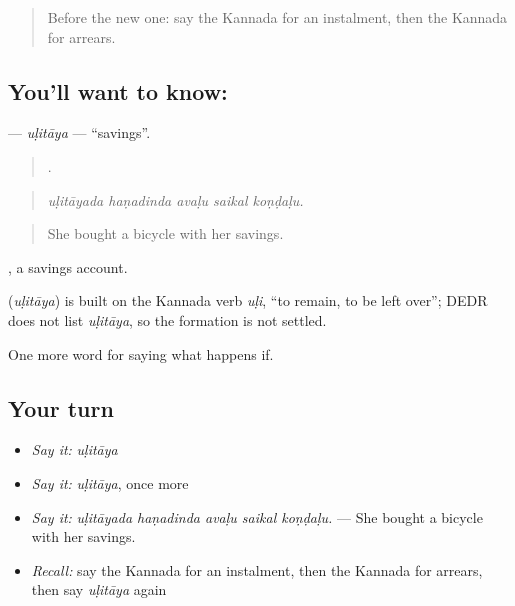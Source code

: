 \label{lesson:KA-C417-ulitaya}



\begin{quote}
Before the new one: say the Kannada for an instalment, then the Kannada for arrears.
\end{quote}

\subsection*{You'll want to know: }
\textbf{} — \emph{uḷitāya} — \textquotedblleft{}savings\textquotedblright{}.

\begin{quote}
    .
\end{quote}

\begin{quote}
\emph{uḷitāyada haṇadinda avaḷu saikal koṇḍaḷu.}
\end{quote}

\begin{quote}
She bought a bicycle with her savings.
\end{quote}

 , a savings account.

\begin{cousinweb}
\textbf{} (\emph{uḷitāya}) is built on the Kannada verb \emph{uḷi}, \textquotedblleft{}to remain, to be left over\textquotedblright{}; DEDR does not list \emph{uḷitāya}, so the formation is not settled.
\end{cousinweb}

\begin{grammarlens}[title={What you've built}]
One more word for saying what happens if.
\end{grammarlens}

\subsection*{Your turn}
\begin{itemize}
\raggedright
  \item \emph{Say it:} \emph{uḷitāya}
  \item \emph{Say it:} \emph{uḷitāya}, once more
  \item \emph{Say it:} \emph{uḷitāyada haṇadinda avaḷu saikal koṇḍaḷu.} — She bought a bicycle with her savings.
  \item \emph{Recall:} say the Kannada for an instalment, then the Kannada for arrears, then say \emph{uḷitāya} again
\end{itemize}

